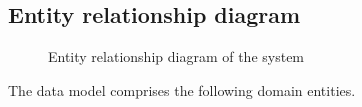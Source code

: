 

\subsection{Entity relationship diagram}
\label{subsec:er-diagram}

\begin{figure}[H]
  \centering
  \caption{Entity relationship diagram of the system}
  \label{fig:er-diagram}
\end{figure}

%

The data model comprises the following domain entities.

